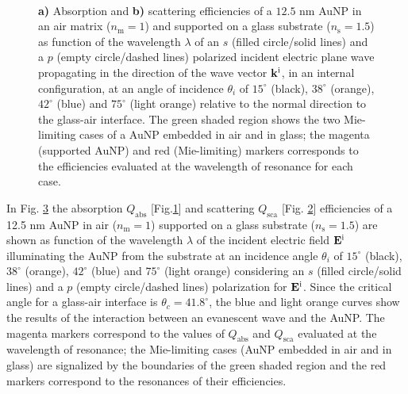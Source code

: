 \begin{figure}[b!]
    \def\svgwidth{.95\textwidth}
    \centering
    \hspace*{-28.5em}%
    \vspace*{-1.25em}%
        \begin{subfigure}{.71\textwidth}\caption{ }\label{sfig:SuppObl:Eff:Abs}\end{subfigure}%
        \begin{subfigure}{.25\textwidth}\caption{ }\label{sfig:SuppObl:Eff:Sca}\end{subfigure} \\
    \vspace*{-.5em}
    \caption[Absorption and Scattering Efficiencies of a 12.5 nm AuNP on a Interface Illuminated in an internal configuration at oblique incidence]{\textbf{a)} Absorption and \textbf{b)} scattering efficiencies of a $12.5$ nm AuNP in an air matrix ($n_\text{m} = 1$) and supported on a glass substrate ($n_\text{s} = 1.5$) as function of the wavelength $\lambda$ of an  $s$ (filled circle/solid lines) and a $p$ (empty circle/dashed lines) polarized incident electric plane wave propagating in the direction of the wave vector $\vb{k}^\text{i}$, in an internal configuration, at an angle of incidence $\theta_i$ of $15^\circ$ (black),  $38^\circ$ (orange),  $42^\circ$ (blue) and  $75^\circ$ (light orange) relative to the normal direction to the glass-air interface. The green shaded region shows the two Mie-limiting cases of a AuNP embedded in air and in glass; the magenta (supported AuNP) and red (Mie-limiting) markers corresponds to the efficiencies evaluated at the wavelength of resonance for each case.}
\label{fig:SuppObl:Eff}
\end{figure}

In Fig. \ref{fig:SuppObl:Eff} the absorption $Q_\text{abs}$ [Fig.\ref{sfig:SuppObl:Eff:Abs}] and scattering $Q_\text{sca}$ [Fig. \ref{sfig:SuppObl:Eff:Sca}] efficiencies of a 12.5 nm AuNP in air ($n_\text{m} = 1$) supported on a glass substrate ($n_\text{s} = 1.5$) are shown as function of the wavelength $\lambda$ of the incident electric field $\vb{E}^\text{i}$ illuminating the AuNP from the substrate at an incidence angle $\theta_i$ of $15^\circ$ (black),  $38^\circ$ (orange),   $42^\circ$ (blue) and  $75^\circ$ (light orange) considering an $s$ (filled circle/solid lines) and a $p$ (empty circle/dashed lines) polarization for $\vb{E}^\text{i}$. Since the critical angle for a glass-air interface is $\theta_c = 41.8^\circ$, the blue and light orange curves show the results of the interaction between an evanescent wave and the AuNP. The magenta markers correspond to the values of $Q_\text{abs}$ and $Q_\text{sca}$ evaluated at the wavelength of resonance; the Mie-limiting cases (AuNP embedded in air and in glass)  are signalized by the boundaries of the green shaded region  and the red markers correspond to the resonances of their efficiencies.

